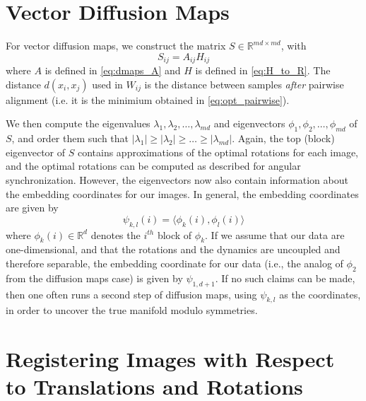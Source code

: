 \documentclass{pnastwo}
\begin{document}
\begin{article}
\begin{materials}
\section{Vector Diffusion Maps \cite{singer2012vector}}

For vector diffusion maps, we construct the matrix $S \in \mathbb{R}^{md \times md}$, with
\begin{equation}
	S_{ij} = A_{ij} H_{ij}
\end{equation}
%
where $A$ is defined in \eqref{eq:dmaps_A} and $H$ is defined in \eqref{eq:H_to_R}.
%
The distance $d(x_i, x_j)$ used in $W_{ij}$ is the distance between samples {\em after} pairwise alignment (i.e. it is the minimium obtained in \eqref{eq:opt_pairwise}). 

We then compute the eigenvalues $\lambda_1, \lambda_2, \dots, \lambda_{md}$ and eigenvectors $\phi_1, \phi_2, \dots, \phi_{md}$ of $S$, and order them such that $|\lambda_1| \ge |\lambda_2| \ge \dots \ge |\lambda_{md}|$.
%
Again, the top (block) eigenvector of $S$ contains approximations of the optimal rotations for each image, and the optimal rotations can be computed as described for angular synchronization.
%
However, the eigenvectors now also contain information about the embedding coordinates for our images.
%
In general, the embedding coordinates are given by 
\begin{equation}
\psi_{k,l} (i) = \langle \phi_k(i), \phi_l(i) \rangle
\end{equation}
where $\phi_k(i) \in \mathbb{R}^d$ denotes the $i^{th}$ block of $\phi_k$.
%
If we assume that our data are one-dimensional, and that the rotations and the dynamics are uncoupled and therefore separable, the embedding coordinate for our data (i.e., the analog of $\phi_2$ from the diffusion maps case) is given by $\psi_{1,d+1}$.
%
If no such claims can be made, then one often runs a second step of diffusion maps, using $\psi_{k,l}$ as the coordinates, in order to uncover the true manifold modulo symmetries. 

\section{Registering Images with Respect to Translations and Rotations} \label{subsec:trans_rot_register}


\end{materials}
\end{article}
\end{document}
